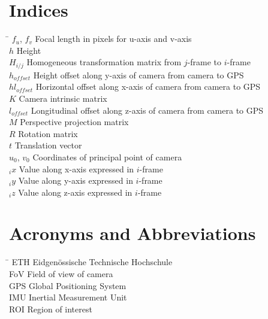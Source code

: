 \section*{Indices}
\begin{tabbing}
 \hspace*{1.6cm}  \= \kill
$f_u$, $f_v$             \> Focal length in pixels for u-axis and v-axis \\[0.5ex]
$h$                     \> Height\\[0.5ex] 
$H_{i/j}$               \> Homogeneous transformation matrix from $j$-frame to $i$-frame \\[0.5ex] 
$h_{offset}$            \> Height offset along y-axis of camera from camera to GPS \\[0.5ex] 
$hl_{offset}$           \> Horizontal offset along x-axis of camera from camera to GPS \\[0.5ex] 
$K$		 			    \> Camera intrinsic matrix \\[0.5ex] 
$l_{offset}$            \> Longitudinal offset along z-axis of camera from camera to GPS\\[0.5ex] 
$M$                     \> Perspective projection matrix \\[0.5ex] 
$R$                     \> Rotation matrix \\[0.5ex] 
$t$                     \> Translation vector \\[0.5ex] 
$u_0$, $v_0$             \> Coordinates of principal point of camera \\[0.5ex] 
$_i x$                  \> Value along x-axis expressed in $i$-frame  \\[0.5ex] 
$_i y$                  \> Value along y-axis expressed in $i$-frame  \\[0.5ex] 
$_i z$                  \> Value along z-axis expressed in $i$-frame  \\[0.5ex] 
\end{tabbing}

\section*{Acronyms and Abbreviations}
\begin{tabbing}
 \hspace*{1.6cm}  \= \kill
 ETH \> Eidgenössische Technische Hochschule \\[0.5ex]
 FoV  \> Field of view of camera \\[0.5ex]
 GPS \> Global Positioning System \\[0.5ex]
 IMU \> Inertial Measurement Unit \\[0.5ex]
 ROI \>  Region of interest \\[0.5ex]
\end{tabbing}